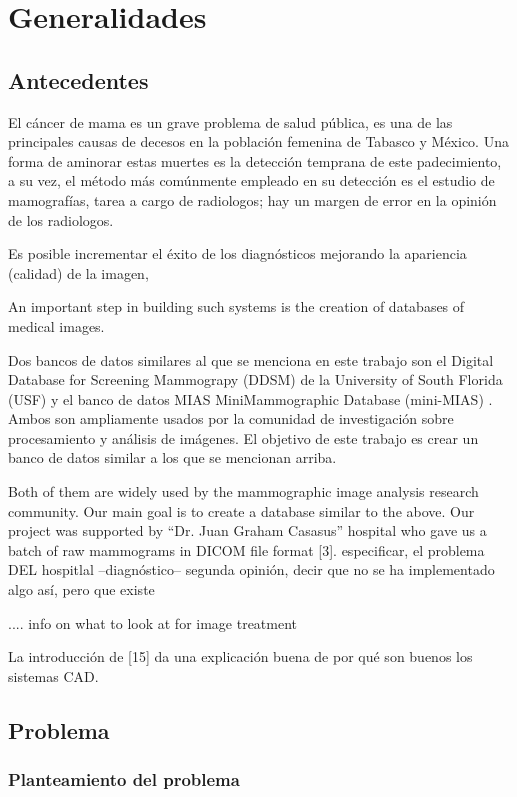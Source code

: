 \chapter{Generalidades}

\section{Antecedentes}

El cáncer de mama es un grave problema de salud pública, es una de las
principales causas de decesos en la población femenina de Tabasco y México. Una 
forma de aminorar estas muertes es la detección temprana de este padecimiento, a
su vez, el método más comúnmente empleado en su detección es el estudio de
mamografías, tarea a cargo de radiologos; hay un margen de error en la opinión
de los radiologos.

Es posible incrementar el éxito de los diagnósticos mejorando la apariencia
(calidad) de la imagen, 

An important step in building such
systems is the creation of databases of medical images. 

Dos bancos de datos similares al que se menciona en este trabajo son el Digital
Database for Screening Mammograpy (DDSM) de la University of South Florida (USF) 
\cite{} y el banco de datos MIAS MiniMammographic Database (mini-MIAS) \cite{}. Ambos son
ampliamente usados por la comunidad de investigación sobre procesamiento y análisis de
imágenes. El objetivo de este trabajo es crear un banco de datos similar a los que
se mencionan arriba. 

Both of them are widely used by the mammographic image analysis research
community.  Our main goal is to create a database similar to the above.  Our
project was supported by “Dr. Juan Graham Casasus” hospital who gave us a batch
of raw mammograms in DICOM file format [3].  especificar, el problema DEL
hospitlal --diagnóstico-- segunda opinión, decir que no se ha implementado algo
así, pero que existe
 
.... info on what to look at for image treatment 

La introducción de [15] da una explicación buena de por qué son buenos los
sistemas CAD.

\section{Problema}
\subsection{Planteamiento del problema}


